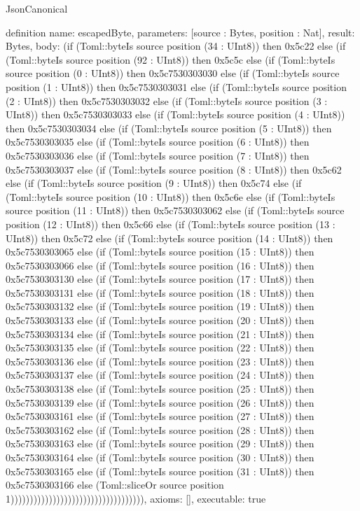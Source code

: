 \begin{lexlean}{JsonCanonical}
\begin{semanticmodule}
definition{
  name: escapedByte,
  parameters: [source : Bytes, position : Nat],
  result: Bytes,
  body: (if (Toml::byteIs source position (34 : UInt8)) then 0x5c22 else (if (Toml::byteIs source position (92 : UInt8)) then 0x5c5c else (if (Toml::byteIs source position (0 : UInt8)) then 0x5c7530303030 else (if (Toml::byteIs source position (1 : UInt8)) then 0x5c7530303031 else (if (Toml::byteIs source position (2 : UInt8)) then 0x5c7530303032 else (if (Toml::byteIs source position (3 : UInt8)) then 0x5c7530303033 else (if (Toml::byteIs source position (4 : UInt8)) then 0x5c7530303034 else (if (Toml::byteIs source position (5 : UInt8)) then 0x5c7530303035 else (if (Toml::byteIs source position (6 : UInt8)) then 0x5c7530303036 else (if (Toml::byteIs source position (7 : UInt8)) then 0x5c7530303037 else (if (Toml::byteIs source position (8 : UInt8)) then 0x5c62 else (if (Toml::byteIs source position (9 : UInt8)) then 0x5c74 else (if (Toml::byteIs source position (10 : UInt8)) then 0x5c6e else (if (Toml::byteIs source position (11 : UInt8)) then 0x5c7530303062 else (if (Toml::byteIs source position (12 : UInt8)) then 0x5c66 else (if (Toml::byteIs source position (13 : UInt8)) then 0x5c72 else (if (Toml::byteIs source position (14 : UInt8)) then 0x5c7530303065 else (if (Toml::byteIs source position (15 : UInt8)) then 0x5c7530303066 else (if (Toml::byteIs source position (16 : UInt8)) then 0x5c7530303130 else (if (Toml::byteIs source position (17 : UInt8)) then 0x5c7530303131 else (if (Toml::byteIs source position (18 : UInt8)) then 0x5c7530303132 else (if (Toml::byteIs source position (19 : UInt8)) then 0x5c7530303133 else (if (Toml::byteIs source position (20 : UInt8)) then 0x5c7530303134 else (if (Toml::byteIs source position (21 : UInt8)) then 0x5c7530303135 else (if (Toml::byteIs source position (22 : UInt8)) then 0x5c7530303136 else (if (Toml::byteIs source position (23 : UInt8)) then 0x5c7530303137 else (if (Toml::byteIs source position (24 : UInt8)) then 0x5c7530303138 else (if (Toml::byteIs source position (25 : UInt8)) then 0x5c7530303139 else (if (Toml::byteIs source position (26 : UInt8)) then 0x5c7530303161 else (if (Toml::byteIs source position (27 : UInt8)) then 0x5c7530303162 else (if (Toml::byteIs source position (28 : UInt8)) then 0x5c7530303163 else (if (Toml::byteIs source position (29 : UInt8)) then 0x5c7530303164 else (if (Toml::byteIs source position (30 : UInt8)) then 0x5c7530303165 else (if (Toml::byteIs source position (31 : UInt8)) then 0x5c7530303166 else (Toml::sliceOr source position 1))))))))))))))))))))))))))))))))))),
  axioms: [],
  executable: true
}


\end{semanticmodule}
\end{lexlean}
